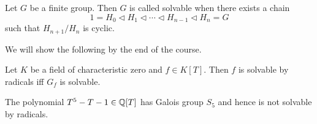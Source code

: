 \documentclass{article}
\begin{document}
\begin{dfn}
  
  Let $G$ be a finite group.
  Then $G$ is called solvable when
  there exists a chain \[
    1 = H_0 \triangleleft H_1 \triangleleft
    \cdots \triangleleft H_{n-1} \triangleleft H_n = G
  \]
  such that $H_{n+1} / H_n$ is cyclic.
\end{dfn}

We will show the following by the end of the course.
\begin{prop}
  
  Let $K$ be a field of characteristic zero and $f \in K[T]$.
  Then $f$ is solvable by radicals iff $G_f$ is solvable.
\end{prop}

\begin{prop}
  The polynomial $T^5 - T - 1 \in \mathbb{Q}[T]$ has Galois group $S_5$
  and hence is not solvable by radicals.
\end{prop}


\end{document}
